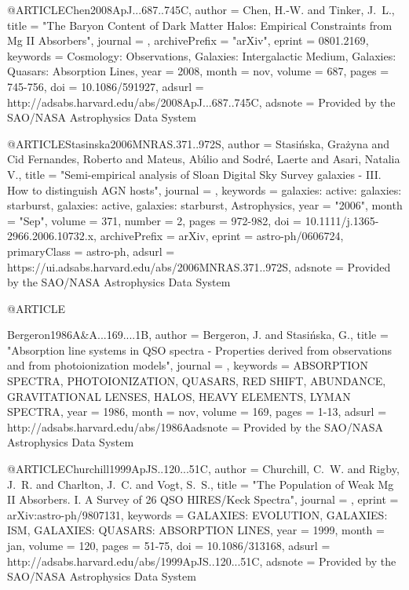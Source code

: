 \documentclass[twocolumn]{aastex62}
\begin{document}
{{{{{{{{{@ARTICLE{Chen2008ApJ...687..745C,
   author = {{Chen}, H.-W. and {Tinker}, J.~L.},
    title = "{The Baryon Content of Dark Matter Halos: Empirical Constraints from Mg II Absorbers}",
  journal = {\apj},
archivePrefix = "arXiv",
   eprint = {0801.2169},
 keywords = {Cosmology: Observations, Galaxies: Intergalactic Medium, Galaxies: Quasars: Absorption Lines},
     year = 2008,
    month = nov,
   volume = 687,
    pages = {745-756},
      doi = {10.1086/591927},
   adsurl = {http://adsabs.harvard.edu/abs/2008ApJ...687..745C},
  adsnote = {Provided by the SAO/NASA Astrophysics Data System}
}


@ARTICLE{Stasinska2006MNRAS.371..972S,
       author = {{Stasi{\'n}ska}, Gra{\.z}yna and {Cid Fernandes}, Roberto and
         {Mateus}, Ab{\'\i}lio and {Sodr{\'e}}, Laerte and {Asari}, Natalia V.},
        title = "{Semi-empirical analysis of Sloan Digital Sky Survey galaxies - III. How to distinguish AGN hosts}",
      journal = {\mnras},
     keywords = {galaxies: active: galaxies: starburst, galaxies: active, galaxies: starburst, Astrophysics},
         year = "2006",
        month = "Sep",
       volume = {371},
       number = {2},
        pages = {972-982},
          doi = {10.1111/j.1365-2966.2006.10732.x},
archivePrefix = {arXiv},
       eprint = {astro-ph/0606724},
 primaryClass = {astro-ph},
       adsurl = {https://ui.adsabs.harvard.edu/abs/2006MNRAS.371..972S},
      adsnote = {Provided by the SAO/NASA Astrophysics Data System}
}


@ARTICLE{Bergeron1986A&A...169....1B,
   author = {{Bergeron}, J. and {Stasi{\'n}ska}, G.},
    title = "{Absorption line systems in QSO spectra - Properties derived from observations and from photoionization models}",
  journal = {\aap},
 keywords = {ABSORPTION SPECTRA, PHOTOIONIZATION, QUASARS, RED SHIFT, ABUNDANCE, GRAVITATIONAL LENSES, HALOS, HEAVY ELEMENTS, LYMAN SPECTRA},
     year = 1986,
    month = nov,
   volume = 169,
    pages = {1-13},
   adsurl = {http://adsabs.harvard.edu/abs/1986Aadsnote = {Provided by the SAO/NASA Astrophysics Data System}
}


@ARTICLE{Churchill1999ApJS..120...51C,
   author = {{Churchill}, C.~W. and {Rigby}, J.~R. and {Charlton}, J.~C. and 
	{Vogt}, S.~S.},
    title = "{The Population of Weak Mg II Absorbers. I. A Survey of 26 QSO HIRES/Keck Spectra}",
  journal = {\apjs},
   eprint = {arXiv:astro-ph/9807131},
 keywords = {GALAXIES: EVOLUTION, GALAXIES: ISM, GALAXIES: QUASARS: ABSORPTION LINES},
     year = 1999,
    month = jan,
   volume = 120,
    pages = {51-75},
      doi = {10.1086/313168},
   adsurl = {http://adsabs.harvard.edu/abs/1999ApJS..120...51C},
  adsnote = {Provided by the SAO/NASA Astrophysics Data System}
}


}}}}}}}}}}
\end{document}
